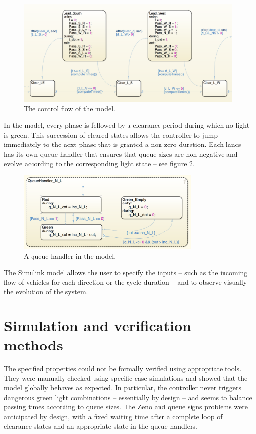 \documentclass[paper=a4, fontsize=11pt]{scrartcl}
\numberwithin{figure}{section}			%
\numberwithin{table}{section}				%
\begin{document}
\begin{figure}[!ht]
    \center
    \includegraphics[width=1\textwidth]{./images/model_1.png}
    \caption{\label{model_1} The control flow of the model.}
\end{figure}

In the model, every phase is followed by a clearance period during which no light is green. This succession of cleared states allows the controller to jump immediately to the next phase that is granted a non-zero duration. Each lanes has its own queue handler that ensures that queue sizes are non-negative and evolve according to the corresponding light state -- see figure \ref{model_2}.

\begin{figure}[!ht]
    \center
    \includegraphics[width=0.8\textwidth]{./images/model_2.png}
    \caption{\label{model_2} A queue handler in the model.}
\end{figure}

The Simulink model allows the user to specify the inputs -- such as the incoming flow of vehicles for each direction or the cycle duration -- and to observe visually the evolution of the system.

\section{Simulation and verification methods}

The specified properties could not be formally verified using appropriate tools. They were manually checked using specific case simulations and showed that the model globally behaves as expected. In particular, the controller never triggers dangerous green light combinations -- essentially by design -- and seems to balance passing times according to queue sizes. The Zeno and queue signs problems were anticipated by design, with a fixed waiting time after a complete loop of clearance states and an appropriate state in the queue handlers.\\
\end{document}
